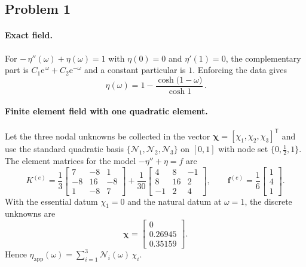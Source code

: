 \documentclass[12pt,a4paper]{article}
\begin{document}
\subsection*{Problem 1}
\paragraph{Exact field.}
For
\(
−\,\eta''(\omega)+\eta(\omega)=1
\)
with \(\eta(0)=0\) and \(\eta'(1)=0\), the complementary part is \(C_1 \mathrm e^{\,\omega}+C_2 \mathrm e^{−\omega}\) and a constant particular is \(1\). Enforcing the data gives
\[
\boxed{\,\eta(\omega)=1−\dfrac{\cosh\!\big(1−\omega\big)}{\cosh 1}\, }.
\]

\paragraph{Finite element field with one quadratic element.}
Let the three nodal unknowns be collected in the vector \(\boldsymbol{\chi}=[\chi_1,\chi_2,\chi_3]^{\mathsf T}\) and use the standard quadratic basis \(\{\mathcal N_1,\mathcal N_2,\mathcal N_3\}\) on \([0,1]\) with node set \(\{0,\tfrac12,1\}\). The element matrices for the model \(−\eta''+\eta=f\) are
\[
K^{(e)}=\frac{1}{3}
\begin{bmatrix}
7&−8&1\\
−8&16&−8\\
1&−8&7
\end{bmatrix}
+\frac{1}{30}
\begin{bmatrix}
4&8&−1\\
8&16&2\\
−1&2&4
\end{bmatrix},
\qquad
\boldsymbol{f}^{(e)}=\frac{1}{6}\begin{bmatrix}1\\4\\1\end{bmatrix}.
\]
With the essential datum \(\chi_1=0\) and the natural datum at \(\omega=1\), the discrete unknowns are
\[
\boldsymbol{\chi}=
\begin{bmatrix}
0\\[2pt]
0.26945\\[2pt]
0.35159
\end{bmatrix}.
\]
Hence
\(
\eta_{\mathrm{app}}(\omega)=\sum_{i=1}^{3}\mathcal N_i(\omega)\,\chi_i
\).
\end{document}
